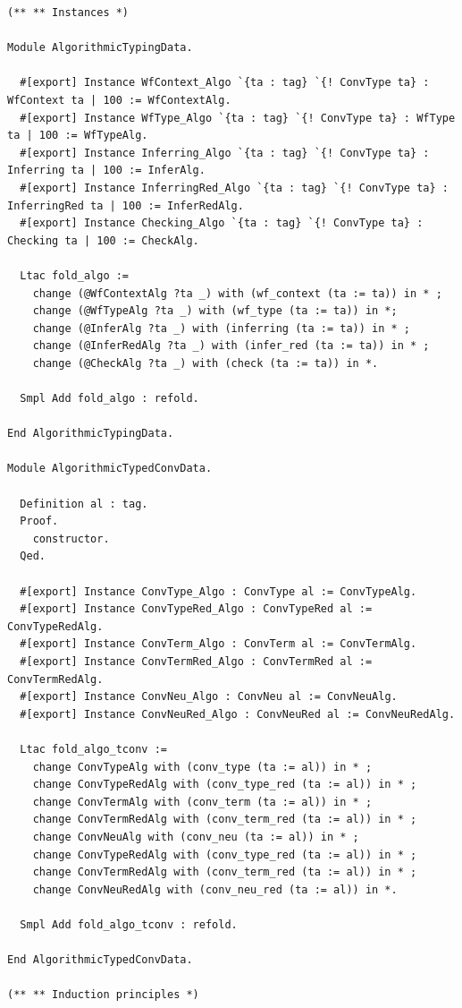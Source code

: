 \documentclass[10pt,a4paper]{amsart}
\begin{document}
\begin{lstlisting}
(** ** Instances *)

Module AlgorithmicTypingData.

  #[export] Instance WfContext_Algo `{ta : tag} `{! ConvType ta} : WfContext ta | 100 := WfContextAlg.
  #[export] Instance WfType_Algo `{ta : tag} `{! ConvType ta} : WfType ta | 100 := WfTypeAlg.
  #[export] Instance Inferring_Algo `{ta : tag} `{! ConvType ta} : Inferring ta | 100 := InferAlg.
  #[export] Instance InferringRed_Algo `{ta : tag} `{! ConvType ta} : InferringRed ta | 100 := InferRedAlg.
  #[export] Instance Checking_Algo `{ta : tag} `{! ConvType ta} : Checking ta | 100 := CheckAlg.

  Ltac fold_algo :=
    change (@WfContextAlg ?ta _) with (wf_context (ta := ta)) in * ;
    change (@WfTypeAlg ?ta _) with (wf_type (ta := ta)) in *;
    change (@InferAlg ?ta _) with (inferring (ta := ta)) in * ;
    change (@InferRedAlg ?ta _) with (infer_red (ta := ta)) in * ;
    change (@CheckAlg ?ta _) with (check (ta := ta)) in *.

  Smpl Add fold_algo : refold.

End AlgorithmicTypingData.

Module AlgorithmicTypedConvData.

  Definition al : tag.
  Proof.
    constructor.
  Qed.

  #[export] Instance ConvType_Algo : ConvType al := ConvTypeAlg.
  #[export] Instance ConvTypeRed_Algo : ConvTypeRed al :=  ConvTypeRedAlg.
  #[export] Instance ConvTerm_Algo : ConvTerm al := ConvTermAlg.
  #[export] Instance ConvTermRed_Algo : ConvTermRed al := ConvTermRedAlg.
  #[export] Instance ConvNeu_Algo : ConvNeu al := ConvNeuAlg.
  #[export] Instance ConvNeuRed_Algo : ConvNeuRed al := ConvNeuRedAlg.

  Ltac fold_algo_tconv :=
    change ConvTypeAlg with (conv_type (ta := al)) in * ;
    change ConvTypeRedAlg with (conv_type_red (ta := al)) in * ;
    change ConvTermAlg with (conv_term (ta := al)) in * ;
    change ConvTermRedAlg with (conv_term_red (ta := al)) in * ;
    change ConvNeuAlg with (conv_neu (ta := al)) in * ;
    change ConvTypeRedAlg with (conv_type_red (ta := al)) in * ;
    change ConvTermRedAlg with (conv_term_red (ta := al)) in * ;
    change ConvNeuRedAlg with (conv_neu_red (ta := al)) in *.

  Smpl Add fold_algo_tconv : refold.

End AlgorithmicTypedConvData.

(** ** Induction principles *)


\end{lstlisting}
\end{document}
